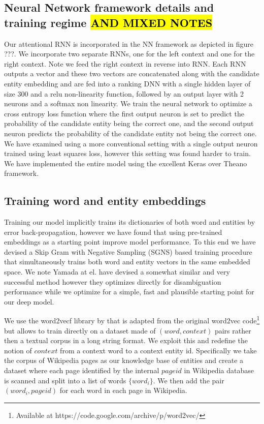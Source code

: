 \documentclass[11pt]{article}
\begin{document}
	\subsection{Neural Network framework details and training regime \hl{AND MIXED NOTES}}
	Our attentional RNN is incorporated in the NN framework as depicted in figure ???. We incorporate two separate RNNs, one for the left context and one for the right context. Note we feed the right context in reverse into RNN. Each RNN outputs a vector and these two vectors are concatenated along with the candidate entity embedding and are fed into a ranking DNN with a single hidden layer of size 300 and a relu non-linearity function, followed by an output layer with 2 neurons and a softmax non linearity. We train the neural network to optimize a cross entropy loss function where the first output neuron is set to predict the probability of the candidate entity being the correct one, and the second output neuron predicts the probability of the candidate entity not being the correct one. We have examined using a more conventional setting with a single output neuron trained using least squares loss, however this setting was found harder to train. We have implemented the entire model using the excellent Keras \cite{chollet2015} over Theano \cite{team2016theano} framework.
	
	\subsection{Training word and entity embeddings}
	
	Training our model implicitly trains its dictionaries of both word and entities by error back-propagation, however we have found that using pre-trained embeddings as a starting point improve model performance. To this end we have devised a Skip Gram with Negative Sampling (SGNS) \cite{mikolov2013distributed} based training procedure that simultaneously trains both word and entity vectors in the same embedded space. We note Yamada at el. \cite{yamada2016joint} have devised a somewhat similar and very successful method however they optimizes directly for disambiguation performance while we optimize for a simple, fast and plausible starting point for our deep model.
	
	We use the word2vecf library by \cite{levy2014dependency} that is adapted from the original word2vec code\footnote{Available at https://code.google.com/archive/p/word2vec/} but allows to train directly on a dataset made of $(word,context)$ pairs rather then a textual corpus in a long string format. We exploit this and redefine the notion of $context$ from a context word to a context entity id. Specifically we take the corpus of Wikipedia pages as our knowledge base of entities and create a dataset where each page identified by the internal $pageid$ in Wikipedia database is scanned and split into a list of words $\{word_i\}$. We then add the pair $(word_i,pageid)$ for each word in each page in Wikipedia.
	
\end{document}
